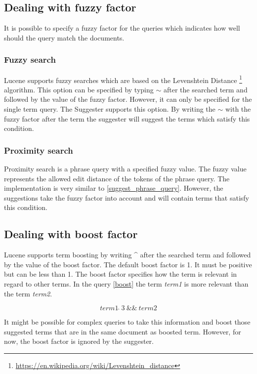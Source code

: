 \subsection{Dealing with fuzzy factor}
\label{fuzzy}
It is possible to specify a fuzzy factor for the queries which indicates how well should the query match the documents.

\subsubsection{Fuzzy search}
Lucene supports fuzzy searches which are based on the Levenshtein Distance
\footnote{\url{https://en.wikipedia.org/wiki/Levenshtein_distance}} algorithm. This option can be specified by typing
$\sim$ after the searched term and followed by the value of the fuzzy factor. However, it can only be specified for the
single term query. The Suggester supports this option. By writing the $\sim$ with the fuzzy factor after the term the
suggester will suggest the terms which satisfy this condition.

\subsubsection{Proximity search}
Proximity search is a phrase query with a specified fuzzy value. The fuzzy value represents the allowed edit distance of the
tokens of the phrase query. The implementation is very similar to \ref{suggest_phrase_query}. However, the suggestions
take the fuzzy factor into account and will contain terms that satisfy this condition.

\subsection{Dealing with boost factor}
Lucene supports term boosting by writing \textbf{\^} after the searched term and followed by the value of the boost factor.
The default boost factor is 1. It must be positive but can be less than 1. The boost factor specifies how the term is relevant
in regard to other terms. In the query \ref{boost} the term \textit{term1} is more relevant than the term \textit{term2}.

\begin{equation}
\label{boost}
term1\ \hat{}\ 3\ \&\&\ term2
\end{equation}

It might be possible for complex queries to take this information and boost those suggested terms that are in the same
document as boosted term. However, for now, the boost factor is ignored by the suggester.

